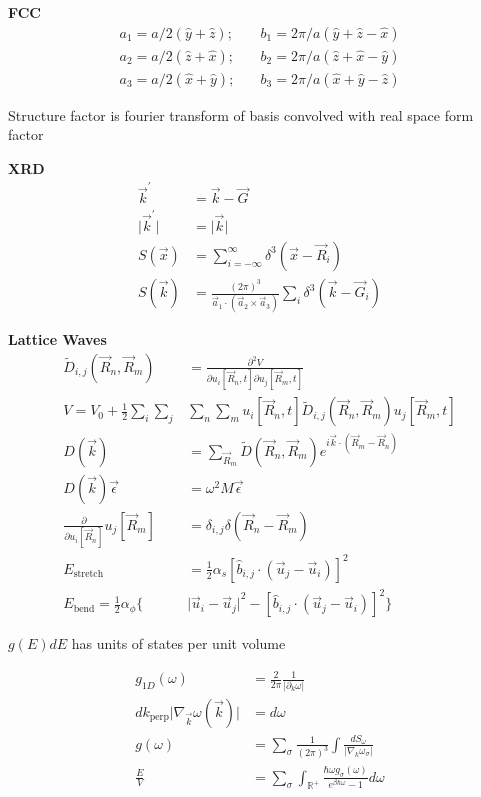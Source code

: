 \documentclass[12pt]{article}
\begin{document}
\begin{multicols}{2}
\noindent
\textbf{FCC}
\begin{align}
  a_1 = a/2(\hat{y} + \hat{z}); &\quad b_1 = 2\pi/a(\hat{y} + \hat{z} - \hat{x})\\
  a_2 = a/2(\hat{z} + \hat{x}); &\quad b_2 = 2\pi/a(\hat{z} + \hat{x} - \hat{y})\\
  a_3 = a/2(\hat{x} + \hat{y}); &\quad b_3 = 2\pi/a(\hat{x} + \hat{y} - \hat{z})
\end{align}

Structure factor is fourier transform of basis convolved with real space form factor

\noindent
\textbf{XRD}
\begin{align}
  \vec{k}^{\prime} &= \vec{k} - \vec{G}\\
  \lvert \vec{k}^{\prime} \rvert &= \lvert \vec{k} \rvert\\
  S(\vec{x}) &= \sum_{i = -\infty}^{\infty} \delta^{3}(\vec{x} - \vec{R}_i)\\
  S(\vec{k}) &= \frac{(2\pi)^3}{\vec{a}_1 \cdot (\vec{a}_2 \times \vec{a}_3)} \sum_i \delta^{3}(\vec{k} - \vec{G}_i)
\end{align}

\noindent
\textbf{Lattice Waves}
\begin{align}
  \tilde{D}_{i,j}(\vec{R}_n, \vec{R}_m) &=
  \frac{\partial^2 V}{\partial u_i[\vec{R}_n, t] \partial u_j[\vec{R}_m, t]}\\
  V = V_0 + \frac{1}{2} \sum_i \sum_j &\sum_n \sum_m
  u_i[\vec{R}_n, t] \tilde{D}_{i, j}(\vec{R}_n, \vec{R}_m) u_j[\vec{R}_m, t]\\
  D(\vec{k})  &= \sum_{\vec{R}_m} \tilde{D}(\vec{R}_n, \vec{R}_m)e^{i\vec{k}
    \cdot (\vec{R}_m - \vec{R}_n)}\\
  D(\vec{k}) \vec{\epsilon} &= \omega^2 M \vec{\epsilon}\\
  \frac{\partial}{\partial u_i[\vec{R}_n]} u_j[\vec{R}_m] &= \delta_{i, j}
  \delta(\vec{R}_n - \vec{R}_m)\\
  E_{\textrm{stretch}} &= \frac{1}{2} \alpha_s[\hat{b}_{i,j} \cdot (\vec{u}_j - \vec{u}_i)]^2\\
  E_{\textrm{bend}} = \frac{1}{2} \alpha_{\phi}\{
  &{\lvert \vec{u}_i - \vec{u}_j \rvert}^2
  - [\hat{b}_{i,j} \cdot (\vec{u}_j - \vec{u}_i)]^2\}
\end{align}

$g(E)dE$ has units of states per unit volume

\begin{align}
  g_{1D}(\omega) &= \frac{2}{2\pi}\frac{1}{\lvert \partial_k \omega\rvert}\\
  dk_{\textrm{perp}}\lvert \nabla_{\vec{k}}\omega(\vec{k})\rvert &= d\omega\\
  g(\omega) &= \sum_{\sigma} \frac{1}{(2\pi)^3}\int
  \frac{dS_{\omega}}{\lvert \nabla_k \omega_\sigma\rvert}\\
  \frac{E}{V} &= \sum_{\sigma} \int_{\mathbb{R}^{+}}
  \frac{\hbar \omega g_{\sigma}(\omega)}{e^{\beta\hbar\omega} - 1}d\omega
\end{align}


\end{multicols}
\end{document}
